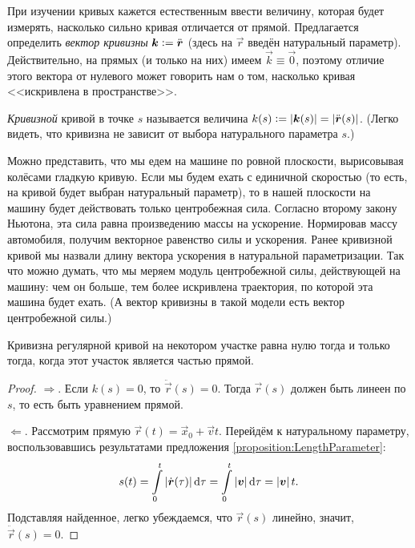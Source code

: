 
При изучении кривых кажется естественным ввести величину, которая будет измерять, насколько сильно кривая отличается от прямой. Предлагается определить \textit{вектор кривизны} $\vec{k} \vcentcolon = \ddot{\vec{r}}$ (здесь на $\vec{r}$ введён натуральный параметр). Действительно, на прямых (и только на них) имеем $\vec{k} \equiv \vec{0}$, поэтому отличие этого вектора от нулевого может говорить нам о том, насколько кривая <<искривлена в пространстве>>.

\begin{definition}
	\textit{Кривизной} кривой в точке $s$ называется величина $k(s) \vcentcolon = \abs{\vec{k}(s)} = \abs{\ddot{\vec{r}}(s)}$. (Легко видеть, что кривизна не зависит от выбора натурального параметра $s$.)
\end{definition}

Можно представить, что мы едем на машине по ровной плоскости, вырисовывая колёсами гладкую кривую. Если мы будем ехать с единичной скоростью (то есть, на кривой будет выбран натуральный параметр), то в нашей плоскости на машину будет действовать только центробежная сила. Согласно второму закону Ньютона, эта сила равна произведению массы на ускорение. Нормировав массу автомобиля, получим векторное равенство силы и ускорения. Ранее кривизной кривой мы назвали длину вектора ускорения в натуральной параметризации. Так что можно думать, что мы меряем модуль центробежной силы, действующей на машину: чем он больше, тем более искривлена траектория, по которой эта машина будет ехать. (А вектор кривизны в такой модели есть вектор центробежной силы.)

\begin{proposition}
	Кривизна регулярной кривой на некотором участке равна нулю тогда и только тогда, когда этот участок является частью прямой.
\end{proposition}

\begin{proof}
	$\Rightarrow$. Если $k(s) = 0$, то $\ddot{\vec{r}}(s) = 0$. Тогда $\vec{r}(s)$ должен быть линеен по $s$, то есть быть уравнением прямой.

	$\Leftarrow$. Рассмотрим прямую $\vec{r}(t) = \vec{x}_0 + \vec{v}t$. Перейдём к натуральному параметру, воспользовавшись результатами предложения \ref{proposition:LengthParameter}:
	\[
		s(t) = \int\limits_0^t\abs{\dot{\vec{r}}(\tau)}\d\tau = \int\limits_0^t \abs{\vec{v}}\d\tau = \abs{\vec{v}}t.
	\]
	Подставляя найденное, легко убеждаемся, что $\vec{r}(s)$ линейно, значит, $\ddot{\vec{r}}(s) = 0$.
\end{proof}


